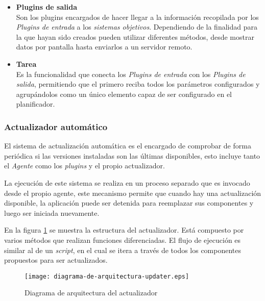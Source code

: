\begin{enumerate}
\begin{itemize}
                        \item \textbf{Plugins de salida} \\
                        Son los plugins encargados de hacer llegar a la información recopilada por los \textit{Plugins de entrada} a los \textit{sistemas objetivos}. Dependiendo de la finalidad para la que hayan sido creados pueden utilizar diferentes métodos, desde mostrar datos por pantalla hasta enviarlos a un servidor remoto.
                        
                        \item \textbf{Tarea} \\
                        Es la funcionalidad que conecta los \textit{Plugins de entrada} con los \textit{Plugins de salida}, permitiendo que el primero reciba todos los parámetros configurados y agrupándolos como un único elemento capaz de ser configurado en el planificador.
                        
                    \end{itemize}
            \end{enumerate}

        \subsubsection{Actualizador automático}
            El sistema de actualización automática es el encargado de comprobar de forma periódica si las versiones instaladas son las últimas disponibles, esto incluye tanto el \textit{Agente} como los \textit{plugins} y el propio actualizador.
            
            La ejecución de este sistema se realiza en un proceso separado que es invocado desde el propio agente, este mecanismo permite que cuando hay una actualización disponible, la aplicación puede ser detenida para reemplazar sus componentes y luego ser iniciada nuevamente.
            
            En la figura \ref{fig:client-diagram} se muestra la estructura del actualizador. Está compuesto por varios métodos que realizan funciones diferenciadas. El flujo de ejecución es similar al de un \textit{script}, en el cual se itera a través de todos los componentes propuestos para ser actualizados. 
            
            \begin{figure}[h!]
            \centering
                \texttt{[image: diagrama-de-arquitectura-updater.eps]}
                \caption{Diagrama de arquitectura del actualizador}
                \label{fig:client-diagram}
            \end{figure}
            
